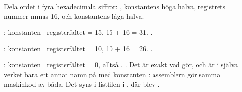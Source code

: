 Dela ordet i fyra hexadecimala siffror: , konstantens höga halva, registrets nummer minus
16, och konstantens låga halva.

: konstanten , registerfältet  = 15, 15 + 16 = 31.
\textbf{}.

: konstanten , registerfältet  = 10, 10 + 16 = 26.
\textbf{}.

: konstanten , registerfältet  = 0, alltså .
\textbf{}. Det är exakt vad  gör, och  är i själva
verket bara ett annat namn på  med konstanten : assemblern gör samma maskinkod
av båda. Det syns i listfilen i , där  blev .
